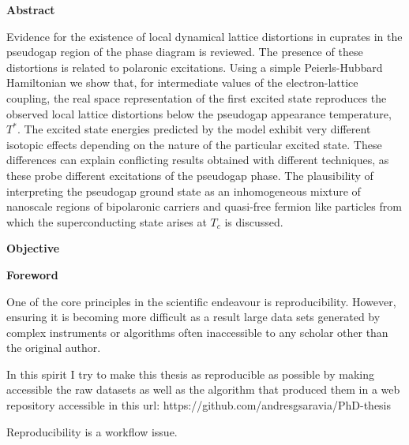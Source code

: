 
\cleardoublepage
{}
{}
\begin{center}
\textbf{\large Abstract}
\end{center}
Evidence for the existence of local dynamical lattice distortions in cuprates in the pseudogap region of the phase diagram is reviewed. 
The presence of these distortions is related to polaronic excitations. 
Using a simple Peierls-Hubbard Hamiltonian we show that, for intermediate values of the electron-lattice coupling, the real space representation of the first excited state reproduces the observed local lattice distortions below the pseudogap appearance temperature, $T^*$. 
The excited state energies predicted by the model exhibit very different isotopic effects depending on the nature of the particular excited state. 
These differences can explain conflicting results obtained with different techniques, as these probe different excitations of the pseudogap phase. 
The plausibility of interpreting the pseudogap ground state as an inhomogeneous mixture of nanoscale regions of bipolaronic carriers and quasi-free fermion like particles from which the superconducting state arises at $T_c$ is discussed.


\cleardoublepage
{}
{}
\begin{center}
\textbf{\large Objective}
\end{center}


\cleardoublepage
{}
{}
\begin{center}
\textbf{\large Foreword}
\end{center}

One of the core principles in the scientific endeavour is reproducibility. 
However, ensuring it is becoming more difficult as a result large data sets generated by complex instruments or algorithms often inaccessible to any scholar other than the original author.

In this spirit I try to make this thesis as reproducible as possible by making accessible the raw datasets as well as the algorithm that produced them in a web repository accessible in this url: https://github.com/andresgsaravia/PhD-thesis

Reproducibility is a workflow issue.